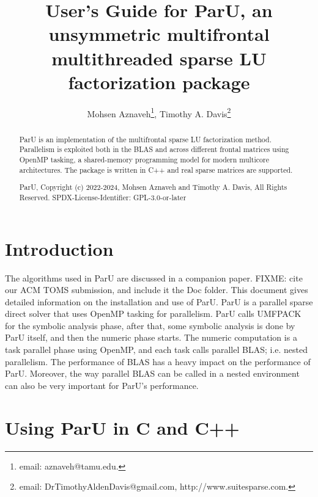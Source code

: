 \documentclass[12pt]{article}
\title{User's Guide for ParU, an unsymmetric multifrontal multithreaded sparse
LU factorization package}
\author{Mohsen Aznaveh\thanks{email: aznaveh@tamu.edu.},
Timothy A. Davis\thanks{email: DrTimothyAldenDavis@gmail.com,
http://www.suitesparse.com.}}
\begin{document}
\maketitle

\begin{abstract}

ParU is an implementation of the multifrontal sparse LU factorization
method.  Parallelism is exploited both in the BLAS and across different frontal
matrices using OpenMP tasking, a shared-memory programming model for modern
multicore architectures. The package is written in C++ and real sparse matrices
are supported.

ParU, Copyright (c) 2022-2024, Mohsen Aznaveh and Timothy A. Davis,
All Rights Reserved.
SPDX-License-Identifier: GPL-3.0-or-later
\end{abstract}

\newpage
{\small
\tableofcontents
}

\section{Introduction}
\label{intro}

The algorithms used in ParU are discussed in a companion paper.
FIXME: cite our ACM TOMS submission, and include it the Doc folder.
This document gives detailed information on the installation and use of ParU.
ParU is a parallel sparse direct solver that uses OpenMP tasking for
parallelism. ParU calls UMFPACK for the symbolic analysis phase, after that,
some symbolic analysis is done by ParU itself, and then the numeric phase
starts. The numeric computation is a task parallel phase using OpenMP, and each
task calls parallel BLAS; i.e. nested parallelism.  The performance of BLAS has
a heavy impact on the performance of ParU. Moreover, the way parallel BLAS can
be called in a nested environment can also be very important for ParU's
performance.

\section{Using ParU in C and C++}
\end{document}
